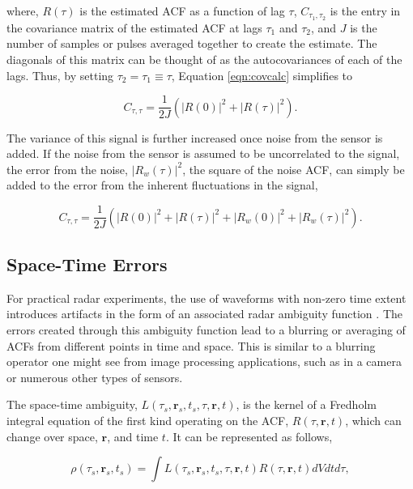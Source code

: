 \documentclass[draft,ras]{agutex}
\begin{document}
\begin{article}
\noindent where, $R(\tau)$ is the estimated ACF as a function of lag $\tau$, $C_{\tau_1,\tau_2}$ is the entry in the covariance matrix of the estimated ACF at lags $\tau_1$ and $\tau_2$,  and $J$ is the number of samples or pulses averaged together to create the estimate. The diagonals of this matrix can be thought of as the autocovariances of each of the lags.  Thus, by setting $\tau_2 = \tau_1 \equiv \tau$, Equation \ref{eqn:covcalc} simplifies to

\begin{equation}
\label{eqn:covdiag}
C_{\tau,\tau} = \frac{1}{2J} \left(  |R(0)|^2 +|R(\tau)|^2\right).
\end{equation}

The variance of this signal is further increased once noise from the sensor is added.  If the noise from the sensor is assumed to be uncorrelated to the signal, the error from the noise, $\left|R_w (\tau)\right|^2$, the square of the noise ACF, can simply be added to the error from the inherent fluctuations in the signal,


\begin{equation}
\label{eqn:covdiagwn}
C_{\tau,\tau} = \frac{1}{2J} \left(  |R(0)|^2 +|R(\tau)|^2 + \left|R_w (0)\right|^2+\left|R_w (\tau)\right|^2\right).
\end{equation}

\subsection{Space-Time Errors}

For practical radar experiments, the use of waveforms with non-zero time extent introduces artifacts in the form of an associated radar ambiguity function \citep{nygren1996}.  The errors created through this ambiguity function lead to a blurring or averaging of ACFs from different points in time and space. This is similar to a blurring operator one might see from image processing applications, such as in a camera or numerous other types of sensors. 
 
The space-time ambiguity, $L(\tau_s,\mathbf{r}_s,t_s,\tau,\mathbf{r},t)$, is the kernel of a Fredholm integral equation of the first kind operating on the ACF, $R(\tau,\mathbf{r},t)$, which can change over space, $\mathbf{r}$, and time $t$. It can be represented as follows,

 \begin{equation}
  \label{eqn:staf}
  \rho(\tau_s,\mathbf{r}_s,t_s) =\int L(\tau_s,\mathbf{r}_s,t_s,\tau,\mathbf{r},t)R(\tau,\mathbf{r},t)dVdtd\tau,
\end{equation}


\end{article}
\end{document}

